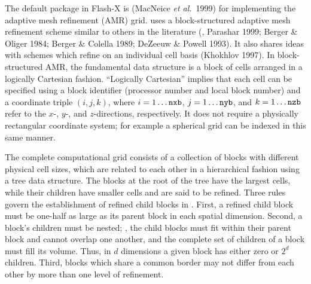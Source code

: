 The default package in Flash-X is
\Paramesh%
(MacNeice {\it et al.}\ 1999) for implementing the adaptive mesh
refinement (AMR) grid. \Paramesh uses a block-structured adaptive mesh
refinement scheme similar to others in the literature (\eg, Parashar
1999; Berger \& Oliger 1984; Berger \& Colella 1989; DeZeeuw \& Powell
1993).  It also shares ideas with schemes which refine on an
individual cell basis (Khokhlov 1997).  In block-structured AMR, the
fundamental data structure is a block of cells arranged in a logically
Cartesian fashion. ``Logically Cartesian'' implies that each
cell can be specified using a block identifier
(processor number and local block number) and a coordinate triple
$(i,j,k)$, where $i=1\ldots{\tt nxb}$, $j=1\ldots{\tt nyb}$, and
$k=1\ldots{\tt nzb}$ refer to the $x$-, $y$-, and $z$-directions,
respectively.   It does not require a physically rectangular coordinate system;
for example a spherical grid can be indexed in this same manner.

The complete computational grid consists of a collection
of blocks with different physical cell sizes, which are related to
each other in a hierarchical fashion using a tree data structure. The
blocks at the root of the tree have the largest cells, while their
children have smaller cells and are said to be refined. Three rules
govern the establishment of refined child blocks in \Paramesh. First, a
refined child block must be one-half as large as its parent block in
each spatial dimension. Second, a block's children must be nested;
\ie, the child blocks must fit within their parent block and cannot
overlap one another, and the complete set of children of a block must
fill its volume. Thus, in $d$ dimensions a given block has either zero
or $2^d$ children.  Third, blocks which share a common border may not
differ from each other by more than one level of refinement.

